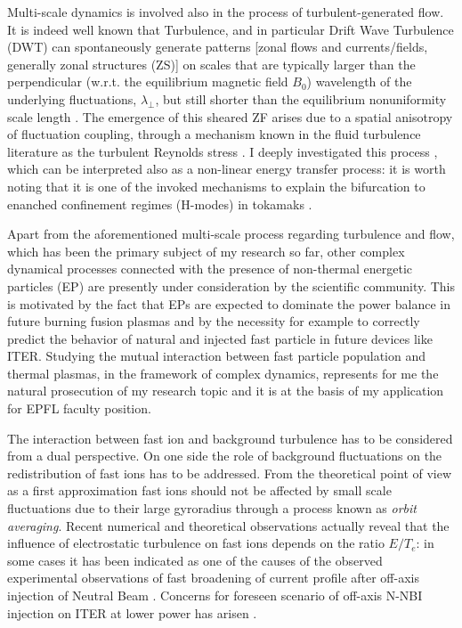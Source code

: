 \documentclass[12pt,a4paper]{article}
\begin{document}
Multi-scale dynamics is involved also in the process of
turbulent-generated flow. It is indeed well known that Turbulence, and
in particular Drift Wave Turbulence (DWT) can spontaneously generate patterns [zonal flows and
currents/fields, generally zonal structures (ZS)] 
on scales that are typically larger than the perpendicular (w.r.t. the
equilibrium magnetic field $B_0$) 
wavelength of the underlying fluctuations, $\lambda_{\perp}$, but
still shorter than the equilibrium nonuniformity scale length
\cite{Hasegawa:1979cp}. 
The emergence of this sheared ZF arises due to a spatial anisotropy of
fluctuation coupling, through a mechanism known in the fluid
turbulence literature as the turbulent Reynolds stress
\cite{Tynan:2009p4426}. I deeply investigated this process \cite{Vianello:2005p1976,Vianello:2006p1149},
which can be interpreted also as a
non-linear energy transfer process: it is worth noting that it is one
of the invoked mechanisms 
to explain the bifurcation to enanched confinement regimes
(H-modes) in tokamaks \cite{Schmitz:2012hwa}. 

Apart from the aforementioned multi-scale process regarding turbulence
and flow, which has been the primary subject of my research so far,
other complex dynamical processes connected with the presence of non-thermal
energetic particles (EP) are presently under consideration by the
scientific community. This is motivated
by the fact that EPs are expected to dominate the power balance in
future burning fusion plasmas \cite{Zonca:2015hs} and by the necessity
for example 
to correctly predict the behavior of natural and injected fast
particle in future devices like ITER. Studying the mutual
interaction between fast particle population and thermal plasmas, in
the framework of complex dynamics, 
represents for me the natural prosecution of my research topic and it
is at the basis of my application for EPFL faculty position. 

The interaction between fast ion and background turbulence has to be
considered from a dual perspective. 
On one side the role of background fluctuations on the
redistribution of fast ions has to be addressed. From the theoretical
point of view as a first approximation fast ions should not be
affected by small scale fluctuations due to their large gyroradius
through a process known as \emph{orbit averaging}. Recent numerical and
theoretical observations \cite{Albergante:2011bj} actually reveal
that the influence of electrostatic turbulence on fast ions depends on the ratio
$E/T_e$: in some cases it has been indicated as one of the causes of
the observed experimental observations of fast broadening of current profile after
off-axis injection of Neutral Beam
\cite{Heidbrink:2009wv,Baranov:2009p4033}. Concerns for
foreseen scenario of off-axis N-NBI injection on ITER at lower power
has arisen \cite{Albergante:2011bj}. 
\end{document}
